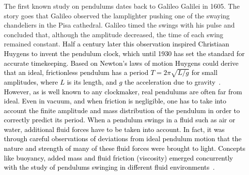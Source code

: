 \documentclass{jfm}
\begin{document}
{The first known study on pendulums dates back to Galileo Galilei in 1605. The story goes that Galileo observed the lamplighter pushing one of the swaying chandeliers in the Pisa cathedral. Galileo timed the swings with his pulse and concluded that, although the amplitude decreased, the time of each swing remained constant. 
\textcolor{black}{Half a century later this observation inspired Christiaan Huygens to invent the pendulum clock, which until 1930 has set the standard for accurate timekeeping. Based on Newton's laws of motion Huygens could derive that an ideal, frictionless pendulum has a period $T= 2  \pi \sqrt{L/g}$ for small amplitudes, where $L$ is its length, and $g$ the acceleration due to gravity~\citep{huygens1986christiaan}. However, as is well known to any clockmaker, real pendulums are often far from ideal. Even in vacuum, and when friction is negligible, one has to take into account the finite amplitude and  mass distribution of the pendulum in order to correctly predict its period. When a pendulum swings in a fluid such as air or water, additional fluid forces have to be taken into account. In fact, it was through careful observations of deviations from ideal pendulum motion that the nature and strength of many of these fluid forces were brought to light. Concepts like buoyancy, added mass and fluid friction (viscosity) emerged concurrently with the study of pendulums swinging in different fluid environments~\citep{stokes1851effect}.}}


\end{document}
